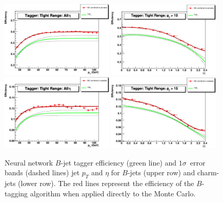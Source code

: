 \begin{itemize}
\begin{figure}[!h!tbp]
\begin{center}
\includegraphics[width=0.48\textwidth]{eps/Systematics/trf_b_0.775_pt.eps}
\includegraphics[width=0.48\textwidth]{eps/Systematics/trf_b_0.775_eta.eps}
\includegraphics[width=0.48\textwidth]{eps/Systematics/trf_c_0.775_pt.eps}
\includegraphics[width=0.48\textwidth]{eps/Systematics/trf_c_0.775_eta.eps}
\end{center}
\vspace{-0.1in}
\caption{Neural network $B$-jet tagger efficiency (green line) and $1\sigma$~error bands (dashed lines) jet $p_{T}$ and $\eta$ for $B$-jets (upper row) and charm-jets (lower row). The red lines represent the efficiency of the $B$-tagging algorithm when applied directly to the Monte Carlo.}
\label{trfserror2}
\end{figure}

\end{itemize}

